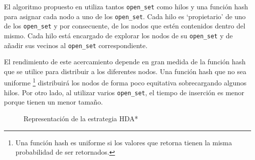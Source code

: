 El algoritmo propuesto en \cite{KFB09}
utiliza tantos \lstinline{open_set} como hilos
y una función hash para asignar cada nodo a uno de los
\lstinline{open_set}.
Cada hilo es `propietario' de uno de los \lstinline{open_set}
y por consecuente, de los nodos que estén contenidos
dentro del mismo.
Cada hilo está encargado de explorar los nodos de su
\lstinline{open_set} y de añadir sus vecinos
al \lstinline{open_set} correspondiente.

El rendimiento de este acercamiento depende en gran medida de la
función hash que se utilice para distribuir a los diferentes nodos.
Una función hash que no sea uniforme
\footnote{Una función hash es uniforme si los valores que retorna
tienen la misma probabilidad de ser retornados.}
distribuirá los nodos de forma poco equitativa
sobrecargando algunos hilos.
Por otro lado, al utilizar varios \lstinline{open_set},
el tiempo de inserción es menor porque tienen un menor tamaño.

\begin{figure}[h]
    \begin{center}
    \end{center}
    \caption{Representación de la estrategia HDA*}
    \label{fig:RepresentacionHDA}
\end{figure}
